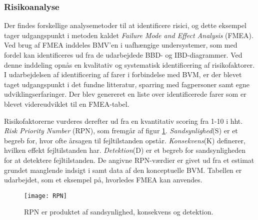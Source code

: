 	\subsubsection{Risikoanalyse}
	Der findes forskellige analysemetoder til at identificere risici, og dette eksempel tager udgangspunkt i metoden kaldet \textit{Failure Mode and Effect Analysis}{} (FMEA). Ved brug af FMEA inddeles BMV'en i uafhængige undersystemer, som med fordel kan identificeres ud fra de udarbejdede BBD- og IBD-diagrammer. Ved denne inddeling opnås en kvalitativ og systematisk identificering af risikofaktorer.
	I udarbejdelsen af identificering af farer i forbindelse med BVM, er der blevet taget udgangspunkt i det fundne litteratur, sparring med fagpersoner samt egne udviklingserfaringer. Der blev genereret en liste over identificerede farer som er blevet videreudviklet til en FMEA-tabel.  
	
	Risikofaktorerne vurderes derefter ud fra en kvantitativ scoring fra 1-10 i hht. \textit{Risk Priority Number}{} (RPN), som fremgår af figur \ref{fig:rpn}. \textit{Sandsynlighed}{}(S) er et begreb for, hvor ofte årsagen til fejltilstanden opstår. \textit{Konsekvens}{}(K) definerer, hvilken effekt fejltilstanden har. \textit{Detektion}{}(D) er et begreb for sandsynligheden for at detektere fejltilstanden. De angivne RPN-værdier er givet ud fra et estimat grundet manglende indsigt i samt data af den konceptuelle BVM. Tabellen er udarbejdet, som et eksempel på, hvorledes FMEA kan anvendes. 	
	 
	\begin{figure}[htb]
	\centering
	\texttt{[image: RPN]}
	\caption	{RPN er produktet af sandsynlighed, konsekvens og detektion.}
	\label{fig:rpn}
	\end{figure}

